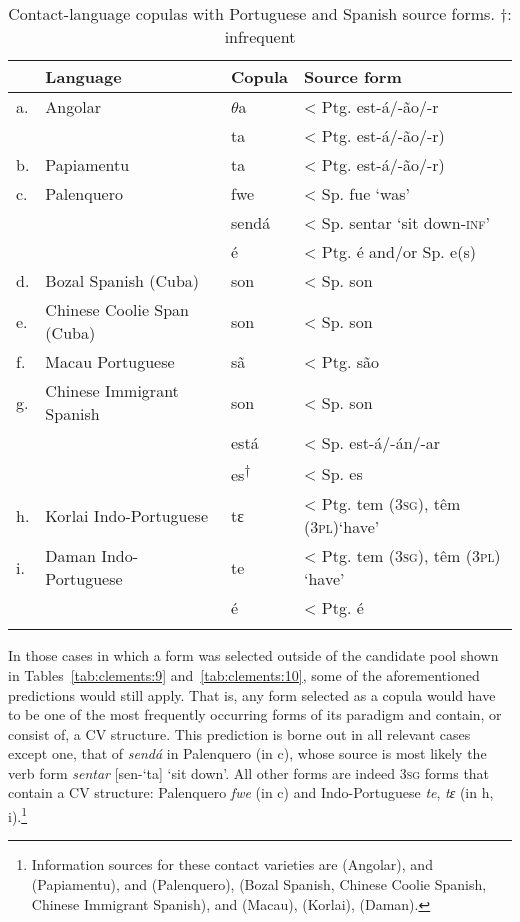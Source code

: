\documentclass[output=paper,colorlinks,citecolor=brown]{langscibook}
\begin{document}
\begin{table}
\begin{tabular}{l@{ }lll}
\lsptoprule
& {Language}  &  {Copula} & {Source form}\\
\midrule
a.& Angolar & $\theta$a & < Ptg. est-á/-ão/-r \\
  & & ta & < Ptg. est-á/-ão/-r)\\
b.& Papiamentu & ta & < Ptg. est-á/-ão/-r)\\
c.& Palenquero & fwe & < Sp. fue `was'\\
  & & sendá & < Sp. sentar `sit down-\textsc{inf}'\\
  & & é & < Ptg. é and/or Sp. e(s)\\
d.& Bozal Spanish (Cuba) & son & < Sp. son\\
e.& Chinese Coolie Span (Cuba) & son & < Sp. son\\
f.& Macau Portuguese & sã & < Ptg. são\\
g.& Chinese Immigrant Spanish & son & < Sp. son\\
  & & está & < Sp. est-á/-án/-ar\\
  & & es\textsuperscript{†} & < Sp. es\\
h.& Korlai Indo-Portuguese & tɛ & < Ptg. tem (3\textsc{sg}), têm (3\textsc{pl})`have'\\
i.& Daman Indo-Portuguese & te & < Ptg. tem (3\textsc{sg}), têm (3\textsc{pl}) `have'\\
  & & é & < Ptg. é\\
\lspbottomrule
\end{tabular}
\caption{Contact-language copulas with Portuguese and Spanish source forms. †: infrequent}
\label{tab:clements:11}
\end{table}



In those cases in which a form was selected outside of the candidate pool shown in Tables~\ref{tab:clements:9} and~\ref{tab:clements:10}, some of the aforementioned predictions would still apply. That is, any form selected as a copula would have to be one of the most frequently occurring forms of its paradigm and contain, or consist of, a CV structure. This prediction is borne out in all relevant cases except one, that of \textit{sendá} in Palenquero (in c), whose source is most likely the verb form \textit{sentar} [sen-`ta\textfishhookr] `sit down'. All other forms are indeed 3\textsc{sg} forms that contain a CV structure: Palenquero \textit{fwe} (in c) and Indo-Portuguese \textit{te}, \textit{tɛ} (in h, i).\footnote{Information sources for these contact varieties are \citealt{Lorenzino2007} (Angolar), \citealt{KouwenbergRamos2007} and \citealt{Maurer1998} (Papiamentu), \citealt{Schwegler1998} and \citealt{SchweglerGreen2007} (Palenquero), \citealt{Clements2009} (Bozal Spanish, Chinese Coolie Spanish, Chinese Immigrant Spanish), \citealt{Batalha1974} and \citealt{pinharanda2010} (Macau), \citealt{Clements1996} (Korlai), \citealt{Clements_Koontz-Garboden2002} (Daman).} 
\end{document}
